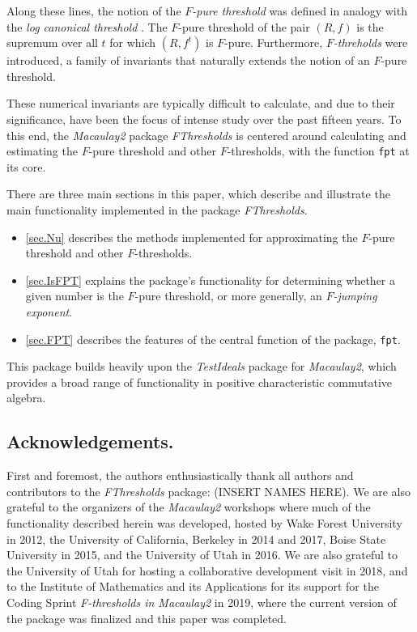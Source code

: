 \documentclass{amsart}
\begin{document}
Along these lines, the notion of the \emph{$F$-pure threshold} was defined in analogy with the \emph{log canonical threshold} \cite{TakagiWatanabeFPureThresh,MustataTakagiWatanabeFThresholdsAndBernsteinSato}.  
The $F$-pure threshold of the pair $(R, f)$ is the supremum over all $t$ for which $(R, f^t)$ is $F$-pure.  
Furthermore, \emph{$F$-threholds} were introduced, a family of invariants that naturally extends the notion of an $F$-pure threshold. 

These numerical invariants are typically difficult to calculate,
and due to their significance, have been the focus of intense study over the past fifteen years.
To this end, the \emph{Macaulay2} package \emph{FThresholds} is centered around calculating and estimating the $F$-pure threshold and other $F$-thresholds, with the function {\tt fpt} at its core. 


There are three main sections in this paper, which describe and illustrate the main functionality implemented in the package \emph{FThresholds}.
\begin{itemize}
\item \autoref{sec.Nu} describes the methods implemented for approximating the $F$-pure threshold and other $F$-thresholds.  
\item \autoref{sec.IsFPT} explains the package's functionality for determining whether a given number is the $F$-pure threshold, or more generally, an \emph{$F$-jumping exponent}.
\item \autoref{sec.FPT} describes the features of the central function of the package, {\tt fpt}. 
\end{itemize}

This package builds heavily upon the \emph{TestIdeals} package for \emph{Macaulay2}, which provides a broad range of functionality in positive characteristic commutative algebra. 

\subsection*{Acknowledgements.}  First and foremost, the authors enthusiastically thank all authors and contributors to the \emph{FThresholds} package: (INSERT NAMES HERE). %
We are also grateful to the organizers of the \emph{Macaulay2} workshops where much of the functionality described herein was developed, hosted by Wake Forest University in 2012, the University of California, Berkeley in 2014 and 2017, Boise State University in 2015, and the University of Utah in 2016. 
We are also grateful to the University of Utah for hosting a collaborative development visit in 2018, and to the Institute of Mathematics and its Applications for its support for the Coding Sprint \emph{F-thresholds in Macaulay2} in 2019, where the current version of the package was finalized and this paper was completed. 
\end{document}
